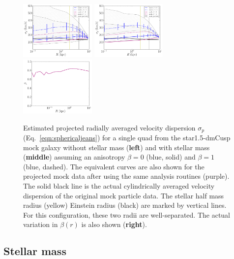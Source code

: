 \documentclass[galley,usenatbib]{mn2e}
\newcommand{\eqnrefp}[1] {(Eq.~\ref{#1})}
\newcommand{\mockBC}{{\sc star1.5-dmCusp}}
\begin{document}
\begin{figure}
\includegraphics[width=0.33\textwidth]{BCQuadR1a_Tms_sigp-1.pdf}
\includegraphics[width=0.33\textwidth]{BCQuadR1a_TmS_sigp-2.pdf}
\includegraphics[width=0.33\textwidth]{BC_beta.pdf}
\caption{ Estimated projected radially averaged velocity dispersion $\sigma_p$
\eqnrefp{eqn:sphericaljeans} for a single quad from the \mockBC{} mock galaxy without stellar mass
(\textbf{left}) and with stellar mass (\textbf{middle}) assuming an anisotropy $\beta=0$
(blue, solid) and $\beta=1$ (blue, dashed).  The equivalent
curves are also shown for the projected mock data after using the same analysis routines
(purple). The solid black line is the actual cylindrically averaged velocity
dispersion of the original mock particle data.  The stellar half mass radius
(yellow) Einstein radius (black) are marked by vertical lines. For this
configuration, these two radii are well-separated. The actual variation in $\beta(r)$ is also shown (\textbf{right}).}
\label{fig:sigp} \end{figure}
\subsection{Stellar mass}
\label{stellar mass}
\end{document}
